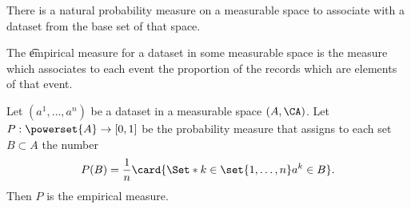 

There is a natural probability measure on a measurable space to associate with a dataset from the base set of that space.


The \t{empirical measure} for a dataset in some measurable space is the measure which associates to each event the proportion of the records which are elements of that event.


Let $(a^1, \dots , a^n)$ be a dataset in a measurable space $(A, \CA)$.
Let $P: \powerset{A} \to [0, 1]$ be the probability measure that assigns to each set $B \subset A$ the number
$$
P(B) = \frac{1}{n} \card{\Set*{k \in \set{1, \dots , n}}{a^k \in B}}.
$$
Then $P$ is the empirical measure.

\blankpage
